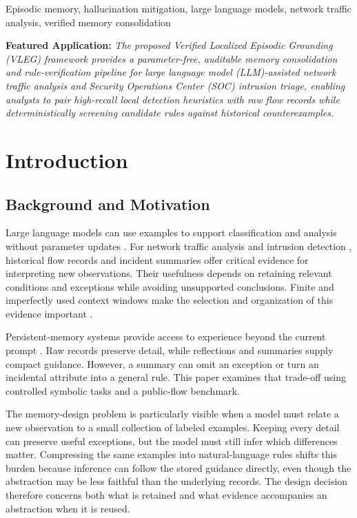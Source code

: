 \documentclass[journal]{IEEEtran}
\theoremstyle{definition}
\theoremstyle{remark}
\begin{document}
\begin{IEEEkeywords}
Episodic memory, hallucination mitigation, large language models, network traffic analysis, verified memory consolidation
\end{IEEEkeywords}

\smallskip\noindent\textbf{Featured Application:} \textit{The proposed Verified Localized Episodic Grounding (VLEG) framework provides a parameter-free, auditable memory consolidation and rule-verification pipeline for large language model (LLM)-assisted network traffic analysis and Security Operations Center (SOC) intrusion triage, enabling analysts to pair high-recall local detection heuristics with raw flow records while deterministically screening candidate rules against historical counterexamples.}

\section{Introduction}
\subsection{Background and Motivation}
Large language models can use examples to support classification and analysis without parameter updates \cite{brown2020language,lewis2020retrieval}. For network traffic analysis and intrusion detection \cite{lin2022etbert,sharafaldin2018cicids,houssel2024explainable,islam2026maids}, historical flow records and incident summaries offer critical evidence for interpreting new observations. Their usefulness depends on retaining relevant conditions and exceptions while avoiding unsupported conclusions. Finite and imperfectly used context windows make the selection and organization of this evidence important \cite{an2024why,liu2024lost}.

Persistent-memory systems provide access to experience beyond the current prompt \cite{packer2023memgpt,wang2023longmem,wang2024memoryllm,gutierrez2024hipporag,maharana2024evaluating}. Raw records preserve detail, while reflections and summaries supply compact guidance. However, a summary can omit an exception or turn an incidental attribute into a general rule. This paper examines that trade-off using controlled symbolic tasks and a public-flow benchmark.

The memory-design problem is particularly visible when a model must relate a new observation to a small collection of labeled examples. Keeping every detail can preserve useful exceptions, but the model must still infer which differences matter. Compressing the same examples into natural-language rules shifts this burden because inference can follow the stored guidance directly, even though the abstraction may be less faithful than the underlying records. The design decision therefore concerns both what is retained and what evidence accompanies an abstraction when it is reused.
\end{document}
